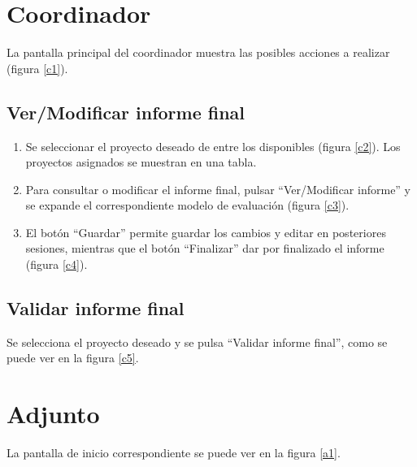 \documentclass[12pt,a4paper,spanish,twoside]{book}
\begin{document}
\section{Coordinador}
La pantalla principal del coordinador muestra las posibles acciones a realizar 
(figura \ref{c1}).

\subsection{Ver/Modificar informe final}
\begin{enumerate}
\item Se seleccionar el proyecto deseado de entre los disponibles (figura 
  \ref{c2}). Los proyectos asignados se muestran en una tabla.
  

\item Para consultar o modificar el informe final, pulsar 
  ``Ver/Modificar informe'' y se expande el correspondiente modelo de 
  evaluación (figura \ref{c3}).


\item El botón ``Guardar'' permite guardar los cambios y editar en 
  posteriores sesiones, mientras que el botón ``Finalizar'' dar por finalizado 
  el informe (figura \ref{c4}).
  
\end{enumerate}

\subsection{Validar informe final}
Se selecciona el proyecto deseado y se pulsa ``Validar informe final'', como se 
puede ver en la figura \ref{c5}.

\section{Adjunto}
La pantalla de inicio correspondiente se puede ver en la figura \ref{a1}.
\end{document}
